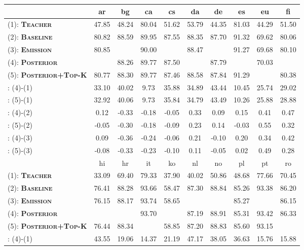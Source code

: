 \documentclass[11pt,a4paper]{article}
\begin{document}
\begin{table*}[t]
\centering
\small
\begin{tabular}{l|ccccccccc}
\hline
\hline
& ar & bg & ca & cs & da & de & es & eu & fi  \\
\hline
(1): {\bf\textsc{Teacher}}  & 47.85 & 48.24 & 80.04 & 51.62 & 53.79 & 44.35 & 81.03 & 44.29 & 51.50 \\
(2): {\bf\textsc{Baseline}}  & 80.82 & 88.59 & 89.95 & 87.55 & 88.35 & 87.70 & 91.32 & 69.62 & 80.06 \\
(3): {\bf\textsc{Emission}}  & 80.85 &  & 90.00 &  & 88.47 &  & 91.27 & 69.68 & 80.10 \\
(4): {\bf\textsc{Posterior}}  &  & 88.26 & 89.77 & 87.50 &  & 87.79 &  & 70.03 &  \\
(5): {\bf\textsc{Posterior+Top-K}}  & 80.77 & 88.30 & 89.77 & 87.46 & 88.58 & 87.84 & 91.29 &  & 80.38 \\
\hline
: (4)-(1) & 33.10 & 40.02 & 9.73 & 35.88 & 34.89 & 43.44 & 10.45 & 25.74 & 29.02 \\
: (5)-(1) & 32.92 & 40.06 & 9.73 & 35.84 & 34.79 & 43.49 & 10.26 & 25.88 & 28.88 \\
: (4)-(2) & 0.12 & -0.33 & -0.18 & -0.05 & 0.33 & 0.09 & 0.15 & 0.41 & 0.47 \\
: (5)-(2) & -0.05 & -0.30 & -0.18 & -0.09 & 0.23 & 0.14 & -0.03 & 0.55 & 0.32 \\
: (4)-(3) & 0.09 & -0.36 & -0.24 & -0.06 & 0.21 & -0.10 & 0.20 & 0.34 & 0.42 \\
: (5)-(3) & -0.08 & -0.33 & -0.23 & -0.10 & 0.11 & -0.05 & 0.02 & 0.49 & 0.28 \\
 \hline\hline
 & hi & hr & it & ko & nl & no & pl & pt & ro \\
 \hline
(1): {\bf\textsc{Teacher}}  & 33.09 & 69.40 & 79.33 & 37.90 & 40.02 & 50.86 & 48.68 & 77.66 & 70.45 \\
(2): {\bf\textsc{Baseline}}  & 76.41 & 88.28 & 93.66 & 58.47 & 87.30 & 88.84 & 85.26 & 93.38 & 86.20 \\
(3): {\bf\textsc{Emission}}  & 76.15 & 88.17 & 93.74 & 58.65 &  &  & 85.27 &  & 86.15 \\
(4): {\bf\textsc{Posterior}}  &  &  & 93.70 &  & 87.19 & 88.91 & 85.31 & 93.42 & 86.33 \\
(5): {\bf\textsc{Posterior+Top-K}}  & 76.44 & 88.34 &  & 58.85 & 87.20 & 88.83 & 85.60 & 93.15 &  \\
\hline
: (4)-(1) & 43.55 & 19.06 & 14.37 & 21.19 & 47.17 & 38.05 & 36.63 & 15.76 & 15.88 \\

\end{tabular}
\end{table*}
\end{document}
